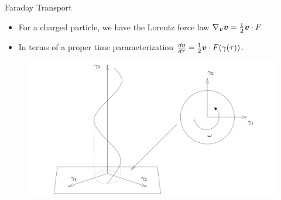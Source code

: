 \documentclass[UKenglish]{beamer}
\begin{document}
\begin{frame}{Faraday Transport}
    \vfill
    \begin{itemize}
        \item For a charged particle, we have the Lorentz force law $\nabla_{\boldsymbol{v}}\boldsymbol{v} = \frac{1}{2} \boldsymbol{v}\cdot F$
        \item In terms of a proper time parameterization $\frac{d\boldsymbol{v}}{d\tau} = \frac{1}{2} \boldsymbol{v} \cdot F(\gamma(\tau))$.
    \end{itemize}
    \begin{figure}
        \centering
        \includegraphics[width=.65\textwidth]{figures/helical_path.png}
    \end{figure}
    \vfill
\end{frame}
\end{document}
